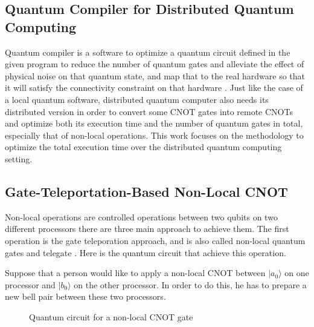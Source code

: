 \subsection{Quantum Compiler for Distributed Quantum Computing}

 Quantum compiler is a software to optimize a quantum circuit defined in the given program to reduce the number of quantum gates and alleviate the effect of physical noise on that quantum state, and map that to the real hardware so that it will satisfy the connectivity constraint on that hardware \cite{qubitallocation}.  Just like the case of a local quantum software, distributed quantum computer also needs its distributed version in order to convert some CNOT gates into remote CNOTs and optimize both its execution time and the number of quantum gates in total, especially that of non-local operations.  This work focuses on the methodology to optimize the total execution time over the distributed quantum computing setting.
 
 \subsection{Gate-Teleportation-Based Non-Local CNOT}
 
Non-local operations are controlled operations between two qubits on two different processors there are three main approach to achieve them. The first operation is the gate teleporation approach, and is also called non-local quantum gates \cite{gateteleportation} and telegate \cite{arithmetic}.  Here is the quantum circuit that achieve this operation.

Suppose that a person would like to apply a non-local CNOT between $|a_0\rangle$ on one processor and $|b_0\rangle$ on the other processor.  In order to do this, he has to prepare a new bell pair between these two processors.  

 \begin{figure}[ht]
  	\begin{center}
		\caption{Quantum circuit for a non-local CNOT gate}
	\end{center}
\end{figure}

